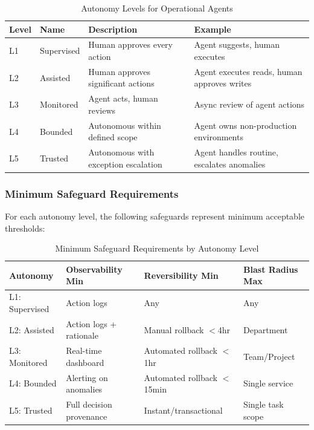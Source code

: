 \begin{table}[htbp]
\centering
\caption{Autonomy Levels for Operational Agents}
\label{tab:autonomy-levels}
\begin{tabular}{llll}
\toprule
\textbf{Level} & \textbf{Name} & \textbf{Description} & \textbf{Example} \\
\midrule
L1 & Supervised & Human approves every action & Agent suggests, human executes \\
L2 & Assisted & Human approves significant actions & Agent executes reads, human approves writes \\
L3 & Monitored & Agent acts, human reviews & Async review of agent actions \\
L4 & Bounded & Autonomous within defined scope & Agent owns non-production environments \\
L5 & Trusted & Autonomous with exception escalation & Agent handles routine, escalates anomalies \\
\bottomrule
\end{tabular}
\end{table}

\subsubsection{Minimum Safeguard Requirements}

For each autonomy level, the following safeguards represent minimum acceptable thresholds:

\begin{table}[htbp]
\centering
\caption{Minimum Safeguard Requirements by Autonomy Level}
\label{tab:safeguard-requirements}
\begin{tabular}{llll}
\toprule
\textbf{Autonomy} & \textbf{Observability Min} & \textbf{Reversibility Min} & \textbf{Blast Radius Max} \\
\midrule
L1: Supervised & Action logs & Any & Any \\
L2: Assisted & Action logs + rationale & Manual rollback $<$4hr & Department \\
L3: Monitored & Real-time dashboard & Automated rollback $<$1hr & Team/Project \\
L4: Bounded & Alerting on anomalies & Automated rollback $<$15min & Single service \\
L5: Trusted & Full decision provenance & Instant/transactional & Single task scope \\
\bottomrule
\end{tabular}
\end{table}


